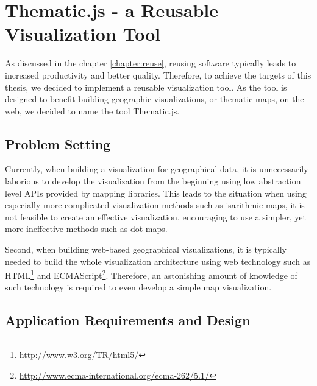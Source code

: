 
\chapter{Thematic.js - a Reusable Visualization Tool}
\label{chapter:implementation}




As discussed in the chapter \ref{chapter:reuse}, reusing software typically leads to increased productivity and better quality. Therefore, to achieve the targets of this thesis, we decided to implement a reusable visualization tool. As the tool is designed to benefit building geographic visualizations, or thematic maps, on the web, we decided to name the tool Thematic.js.

\section{Problem Setting}

Currently, when building a visualization for geographical data, it is unnecessarily laborious to develop the visualization from the beginning using low abstraction level APIs provided by mapping libraries. This leads to the situation when using especially more complicated visualization methods such as isarithmic maps, it is not feasible to create an effective visualization, encouraging to use a simpler, yet more ineffective methods such as dot maps.

Second, when building web-based geographical visualizations, it is typically needed to build the whole visualization architecture using web technology such as HTML\footnote{\url{http://www.w3.org/TR/html5/}} and ECMAScript\footnote{\url{http://www.ecma-international.org/ecma-262/5.1/}}. Therefore, an astonishing amount of knowledge of such technology is required to even develop a simple map visualization. 

\section{Application Requirements and Design}
\label{section:requirements}

